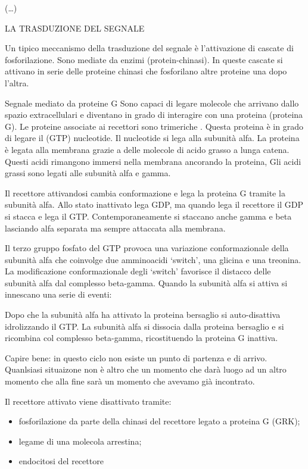 \documentclass[]{article}
\begin{document}
(\ldots{})

LA TRASDUZIONE DEL SEGNALE

Un tipico meccanismo della trasduzione del segnale è l'attivazione di
cascate di fosforilazione. Sono mediate da enzimi (protein-chinasi). In
queste cascate si attivano in serie delle proteine chinasi che
fosforilano altre proteine una dopo l'altra.

Segnale mediato da proteine G Sono capaci di legare molecole che
arrivano dallo spazio extracellulari e diventano in grado di interagire
con una proteina (proteina G). Le proteine associate ai recettori sono
trimeriche . Questa proteina è in grado di legare il (GTP) nucleotide.
Il nucleotide si lega alla subunità alfa. La proteina è legata alla
membrana grazie a delle molecole di acido grasso a lunga catena. Questi
acidi rimangono immersi nella membrana ancorando la proteina, Gli acidi
grassi sono legati alle subunità alfa e gamma.

Il recettore attivandosi cambia conformazione e lega la proteina G
tramite la subunità alfa. Allo stato inattivato lega GDP, ma quando lega
il recettore il GDP si stacca e lega il GTP. Contemporaneamente si
staccano anche gamma e beta lasciando alfa separata ma sempre attaccata
alla membrana.

Il terzo gruppo fosfato del GTP provoca una variazione conformazionale
della subunità alfa che coinvolge due amminoacidi `switch', una glicina
e una treonina. La modificazione conformazionale degli `switch'
favorisce il distacco delle subunità alfa dal complesso beta-gamma.
Quando la subunità alfa si attiva si innescano una serie di eventi:

Dopo che la subunità alfa ha attivato la proteina bersaglio si
auto-disattiva idrolizzando il GTP. La subunità alfa si dissocia dalla
proteina bersaglio e si ricombina col complesso beta-gamma,
ricostituendo la proteina G inattiva.

Capire bene: in questo ciclo non esiste un punto di partenza e di
arrivo. Quanlsiasi situaizone non è altro che un momento che darà luogo
ad un altro momento che alla fine sarà un momento che avevamo già
incontrato.

Il recettore attivato viene disattivato tramite:

\begin{itemize}
\itemsep1pt\parskip0pt
\item
  fosforilazione da parte della chinasi del recettore legato a proteina
  G (GRK);
\item
  legame di una molecola arrestina;
\item
  endocitosi del recettore
\end{itemize}
\end{document}
